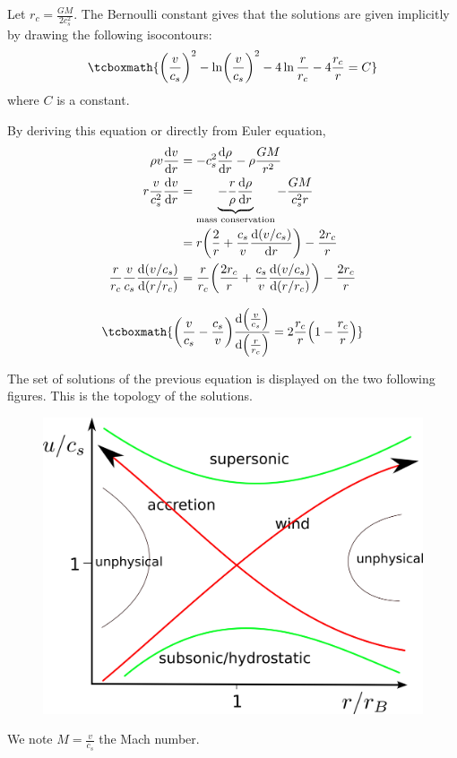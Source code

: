 \documentclass[10pt,a4paper,english]{article}
\let\originalleft\left
\let\originalright\right
\renewcommand{\left}{\mathopen{}\mathclose\bgroup\originalleft}
\renewcommand{\right}{\aftergroup\egroup\originalright}
\begin{document}
Let $r_c = \frac{GM}{2c_s^2}$. The Bernoulli constant gives that the
solutions are given implicitly by drawing the following isocontours:
\begin{equation}
    \tcboxmath{
        \left( \frac{v}{c_s} \right)^2 - \ln \left( \frac{v}{c_s} \right)^2 - 4\ln \frac{r}{r_c} - 4 \frac{r_c }{r} = C
    }
\end{equation}
where $C$ is a constant.

By deriving this equation or directly from Euler equation,
\begin{align}
    \rho v \frac{\d v}{\d r}  &= -c_s^2 \frac{\d \rho}{\d r} - \rho \frac{GM}{r^2} \\
    r \frac{v}{c_s^2} \frac{\d v}{\d r} &= \underbrace{-\frac{r}{\rho}\frac{\d \rho}{\d r}}_\textrm{mass conservation} - \frac{GM}{c_s^2r} \\
                            &= r \left( \frac{2}{r} + \frac{c_s}{v} \frac{\d(v/c_s)}{\d r} \right) - \frac{2r_c }{r} \\
    \frac{r}{r_c }\frac{v}{c_s }\frac{\d (v/c_s)}{\d (r/r_c)} & = \frac{r}{r_c} \left( \frac{2r_c }{r} + \frac{c_s}{v} \frac{\d(v/c_s)}{\d(r/r_c )} \right) - \frac{2r_c }{r}
\end{align}

\begin{equation}
    \label{eq:speed_eq}
    \tcboxmath{
        \left( \frac{v}{c_s} - \frac{c_s}{v} \right) \frac{\d \left( \frac{v}{c_s} \right) }{\d \left( \frac{r}{r_c } \right) } = 2 \frac{r_c}{r} \left( 1 - \frac{r_c }{r} \right)
    }
\end{equation}

The set of solutions of the previous equation is displayed on the two following 
figures. This is the topology of the solutions.

\begin{figure}[!ht]
  \begin{center}
    \includegraphics[width=.5\columnwidth]{figures/schema_bondi_accretion.png}
  \end{center}
\end{figure}
We note $M = \frac{v}{c_s}$ the Mach number.
\end{document}
